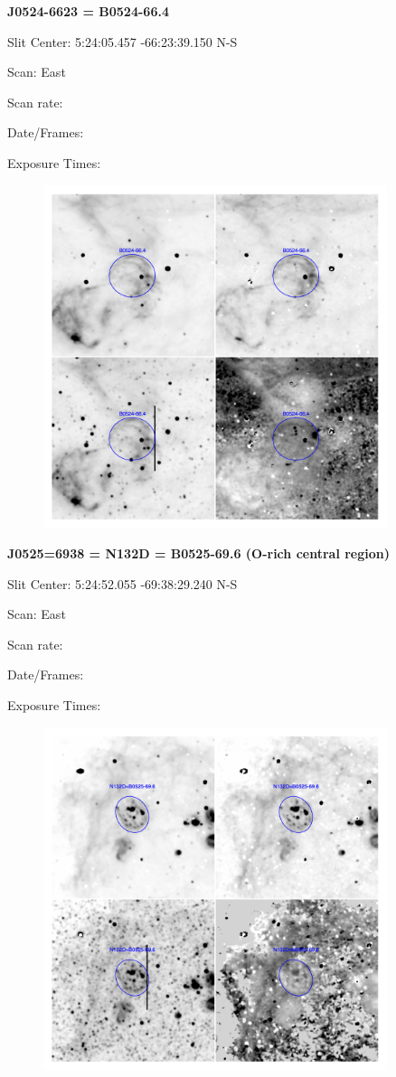 \documentclass[11pt]{article}
\begin{document}
\newpage
{\bf J0524-6623 = B0524-66.4}  
 
Slit Center:   5:24:05.457   -66:23:39.150 N-S

Scan:  East

Scan rate:  

Date/Frames:

Exposure Times:  

\begin{figure}
\includegraphics[width=10.05cm]{snapshots/B0524-664.png}
\end{figure}

\newpage
{\bf J0525=6938 = N132D = B0525-69.6 (O-rich central region)}  
 
Slit Center:   5:24:52.055   -69:38:29.240 N-S

Scan:  East

Scan rate:  

Date/Frames:

Exposure Times:  

\begin{figure}
\includegraphics[width=10.05cm]{snapshots/N132D.png}
\end{figure}
\end{document}
